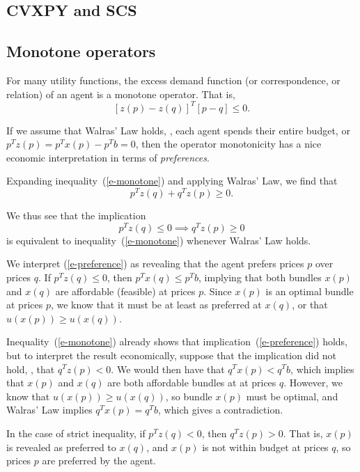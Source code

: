 \documentclass[12pt]{article}
\begin{document}
\subsection{CVXPY and SCS}

\subsection{Monotone operators}
For many utility functions,
the excess demand function
(or correspondence,
or relation) of an agent is a
monotone operator.
That is,
\begin{equation}
\label{e-monotone}
\left[z(p) - z(q) \right]^T \left[p - q\right] \leq 0.
\end{equation}

If we assume that Walras' Law holds, \ie, each agent spends their entire
budget, or $p^T z(p) = p^T x(p) - p^T b = 0$, then the operator monotonicity has
a nice economic interpretation in terms of \emph{preferences}.

Expanding inequality~(\ref{e-monotone}) and applying Walras' Law, we find that
\[
p^T z(q) + q^T z(p) \geq 0.
\]

We thus see that the implication
\begin{equation}
\label{e-preference}
p^T z(q) \leq 0 \implies q^T z(p) \geq 0
\end{equation}
is equivalent
to inequality~(\ref{e-monotone}) whenever Walras' Law holds.

We interpret (\ref{e-preference}) as revealing that the agent prefers prices
$p$ over prices $q$. If $p^T z(q) \leq 0$, then $p^T x(q) \leq p^T b$, implying
that both bundles $x(p)$ and $x(q)$ are affordable (feasible) at prices $p$.
Since $x(p)$ is an optimal bundle at prices $p$, we know that it must be at least
as preferred at $x(q)$, or that $u(x(p)) \geq u(x(q))$.

Inequality~(\ref{e-monotone}) already shows that implication~(\ref{e-preference})
holds, but to interpret the result economically, suppose that the
implication did not hold, \ie, that $q^T z(p) < 0$. We would then have that
$q^T x(p) < q^T b$, which implies that $x(p)$ and $x(q)$ are both affordable
bundles at at prices $q$. However, we know that $u(x(p)) \geq u(x(q))$, so
bundle $x(p)$ must be optimal, and Walras' Law implies $q^T x(p) = q^T b$, which
gives a contradiction. 

In the case of strict inequality, if $p^T z(q) < 0$, then $q^T z(p) > 0$.
That is, $x(p)$ is revealed as preferred to $x(q)$, and $x(p)$ is not within
budget at prices $q$, so prices $p$ are preferred by the agent.
\end{document}
